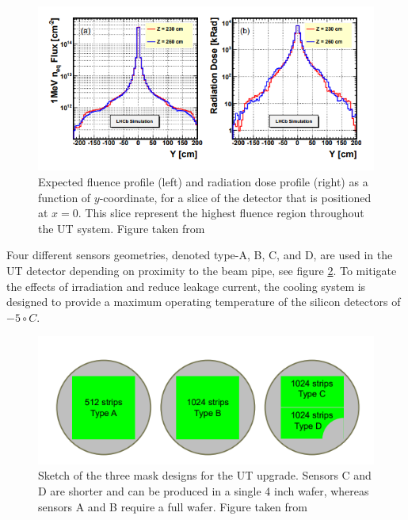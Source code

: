  \begin{figure}[!h]
\centering
\includegraphics{figures/UT_dose.PNG}
\caption{Expected fluence profile (left) and radiation dose profile (right) as a function of $y$-coordinate, for a slice of the detector that is positioned at $x=0$. This slice represent the highest fluence region throughout the UT system. Figure taken from \cite{upgrade_tracker_tdr}
\label{fig:UT_dose}}
\end{figure}

 
 Four different sensors geometries, denoted type-A, B, C, and D, are used in the UT detector depending on proximity to the beam pipe, see figure \ref{fig:UT_sensors}. To mitigate the effects of irradiation and reduce leakage current, the cooling system is designed to provide a maximum operating temperature of the silicon detectors of $-5\circ C$. 
 
 
 
 \begin{figure}[!h]
\centering
\includegraphics{figures/UT_sensors.PNG}
\caption{Sketch of the three mask designs for the UT upgrade. Sensors C and D are shorter and
can be produced in a single 4 inch wafer, whereas sensors A and B require a full wafer.  Figure taken from \cite{upgrade_tracker_tdr}
\label{fig:UT_sensors}}
\end{figure}


 
 
